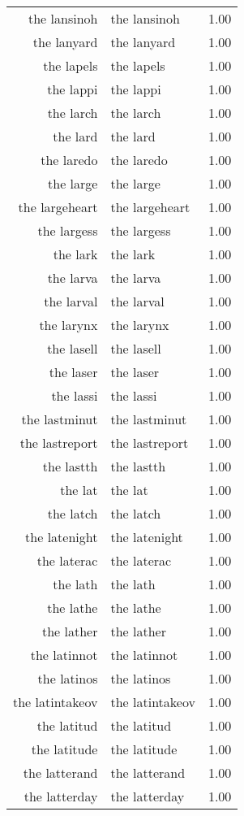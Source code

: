 \begin{table}[ht]
\begin{tabular}{rlr}
  the lansinoh & the lansinoh & 1.00 \\ 
  the lanyard & the lanyard & 1.00 \\ 
  the lapels & the lapels & 1.00 \\ 
  the lappi & the lappi & 1.00 \\ 
  the larch & the larch & 1.00 \\ 
  the lard & the lard & 1.00 \\ 
  the laredo & the laredo & 1.00 \\ 
  the large & the large & 1.00 \\ 
  the largeheart & the largeheart & 1.00 \\ 
  the largess & the largess & 1.00 \\ 
  the lark & the lark & 1.00 \\ 
  the larva & the larva & 1.00 \\ 
  the larval & the larval & 1.00 \\ 
  the larynx & the larynx & 1.00 \\ 
  the lasell & the lasell & 1.00 \\ 
  the laser & the laser & 1.00 \\ 
  the lassi & the lassi & 1.00 \\ 
  the lastminut & the lastminut & 1.00 \\ 
  the lastreport & the lastreport & 1.00 \\ 
  the lastth & the lastth & 1.00 \\ 
  the lat & the lat & 1.00 \\ 
  the latch & the latch & 1.00 \\ 
  the latenight & the latenight & 1.00 \\ 
  the laterac & the laterac & 1.00 \\ 
  the lath & the lath & 1.00 \\ 
  the lathe & the lathe & 1.00 \\ 
  the lather & the lather & 1.00 \\ 
  the latinnot & the latinnot & 1.00 \\ 
  the latinos & the latinos & 1.00 \\ 
  the latintakeov & the latintakeov & 1.00 \\ 
  the latitud & the latitud & 1.00 \\ 
  the latitude & the latitude & 1.00 \\ 
  the latterand & the latterand & 1.00 \\ 
  the latterday & the latterday & 1.00 \\ 

\end{tabular}
\end{table}
